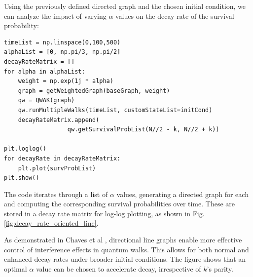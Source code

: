 \documentclass[main.tex]{subfiles}
\begin{document}
Using the previously defined directed graph and the chosen initial condition, we
can analyze the impact of varying $\alpha$ values on the decay rate of the
survival probability:

\begin{lstlisting}[style=code]
timeList = np.linspace(0,100,500)
alphaList = [0, np.pi/3, np.pi/2]
decayRateMatrix = []
for alpha in alphaList:
    weight = np.exp(1j * alpha)
    graph = getWeightedGraph(baseGraph, weight)
    qw = QWAK(graph)
    qw.runMultipleWalks(timeList, customStateList=initCond)
    decayRateMatrix.append(
                  qw.getSurvivalProbList(N//2 - k, N//2 + k))

plt.loglog()
for decayRate in decayRateMatrix:
    plt.plot(survProbList)
plt.show()
\end{lstlisting}

The code iterates through a list of $\alpha$ values, generating a directed
graph for each and computing the corresponding survival probabilities over
time. These are stored in a decay rate matrix for log-log plotting, as shown in
Fig. \ref{fig:decay_rate_oriented_line}.

As demonstrated in Chaves et al \cite{Chaves2023}, directional line graphs
enable more effective control of interference effects in quantum walks. This
allows for both normal and enhanced decay rates under broader initial
conditions. The figure shows that an optimal $\alpha$ value can be chosen to
accelerate decay, irrespective of $k$'s parity.
\end{document}
